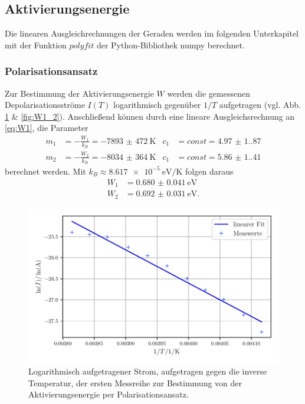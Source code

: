 \subsection{Aktivierungsenergie}
Die linearen Ausgleichrechnungen der Geraden werden im folgenden Unterkapitel mit der Funktion $polyfit$ der Python-Bibliothek numpy\cite{numpy} berechnet.
\subsubsection{Polarisationsansatz}
Zur Bestimmung der Aktivierungsenergie $W$ werden die gemessenen Depolarisationsströme $I(T)$ 
logarithmisch gegenüber $1/T$ aufgetragen (vgl. Abb. \ref{fig:W1_1} \& \ref{fig:W1_2}). Anschließend können durch eine lineare Ausgleichsrechnung an \autoref{eq:W1}, die Parameter
\begin{align}
    m_1 &= - \frac{W_1}{k_B} = \qty{-7893(472)}{\kelvin} & c_1 &= const = \num{4.97(1.87)} \\
    m_2 &= - \frac{W_2}{k_B} = \qty{-8034(364)}{\kelvin} & c_1 &= const = \num{5.86(1.41)}
\end{align}
berechnet werden. Mit $k_B \approx \qty{8,617e-5}{\electronvolt\per\kelvin}$ folgen daraus
\begin{align}
    W_1 &= \qty{0.680(41)}{\electronvolt} \\
    W_2 &= \qty{0.692(31)}{\electronvolt}.
\end{align}
\begin{figure}
    \centering
    \includegraphics[width=0.7\linewidth]{scripts/build/plot1_1.pdf}
    \caption{Logarithmisch aufgetragener Strom, aufgetragen gegen die inverse Temperatur, der ersten Messreihe zur Bestimmung von der Aktivierungsenergie per Polarisationsansatz.}
    \label{fig:W1_1}
\end{figure}
